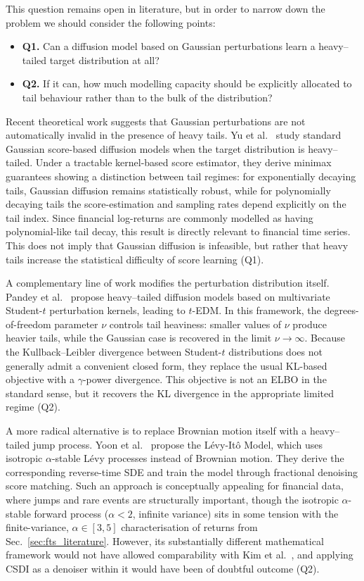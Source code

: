 This question remains open in literature, but in order to narrow down the problem we should consider the following points:
\begin{itemize}
    \item \textbf{Q1.} \quad Can a diffusion model based on Gaussian perturbations learn a heavy--tailed target distribution at all?
    \item \textbf{Q2.} \quad If it can, how much modelling capacity should be explicitly allocated to tail behaviour rather than to the bulk of the distribution?
\end{itemize}
Recent theoretical work suggests that Gaussian perturbations are not automatically invalid in the presence of heavy tails. Yu et al.\ \cite{yu2026diffusion} study standard Gaussian score-based diffusion models when the target distribution is heavy--tailed. Under a tractable kernel-based score estimator, they derive minimax guarantees showing a distinction between tail regimes: for exponentially decaying tails, Gaussian diffusion remains statistically robust, while for polynomially decaying tails the score-estimation and sampling rates depend explicitly on the tail index. Since financial log-returns are commonly modelled as having polynomial-like tail decay, this result is directly relevant to financial time series. This does not imply that Gaussian diffusion is infeasible, but rather that heavy tails increase the statistical difficulty of score learning (Q1).

A complementary line of work modifies the perturbation distribution itself. Pandey et al.\ \cite{pandey2024heavytailed} propose heavy--tailed diffusion models based on multivariate Student-\(t\) perturbation kernels, leading to \(t\)-EDM. In this framework, the degrees-of-freedom parameter \(\nu\) controls tail heaviness: smaller values of \(\nu\) produce heavier tails, while the Gaussian case is recovered in the limit \(\nu \to \infty\). Because the Kullback--Leibler divergence between Student-\(t\) distributions does not generally admit a convenient closed form, they replace the usual KL-based objective with a \(\gamma\)-power divergence. This objective is not an ELBO in the standard sense, but it recovers the KL divergence in the appropriate limited regime (Q2). 

A more radical alternative is to replace Brownian motion itself with a heavy--tailed jump process. Yoon et al.\ \cite{yoon2023score} propose the L\'evy-It\^o Model, which uses isotropic \(\alpha\)-stable L\'evy processes instead of Brownian motion. They derive the corresponding reverse-time SDE and train the model through fractional denoising score matching. Such an approach is conceptually appealing for financial data, where jumps and rare events are structurally important, though the isotropic $\alpha$-stable forward process ($\alpha<2$, infinite variance) sits in some tension with the finite-variance, $\alpha\in[3,5]$ characterisation of returns from Sec.~\ref{sec:fts_literature}. However, its substantially different mathematical framework would not have allowed comparability with Kim et al.\ \cite{kim2025diffusion}, and applying CSDI as a denoiser within it would have been of doubtful outcome (Q2).

